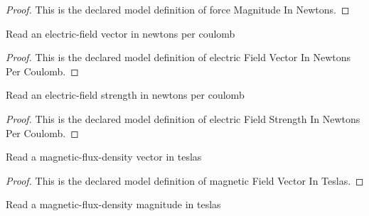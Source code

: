 \begin{proof}
  This is the declared model definition of force Magnitude In Newtons.
\end{proof}
\begin{definition}
  \label{def:physics:phyx-mini-0958:phyxminiproblems-problemphyxmini0958-electricfieldvectorinnewtonspercoulomb}
  Read an electric-field vector in newtons per coulomb
\end{definition}
\begin{proof}
  This is the declared model definition of electric Field Vector In Newtons Per Coulomb.
\end{proof}
\begin{definition}
  \label{def:physics:phyx-mini-0958:phyxminiproblems-problemphyxmini0958-electricfieldstrengthinnewtonspercoulomb}
  Read an electric-field strength in newtons per coulomb
\end{definition}
\begin{proof}
  This is the declared model definition of electric Field Strength In Newtons Per Coulomb.
\end{proof}
\begin{definition}
  \label{def:physics:phyx-mini-0958:phyxminiproblems-problemphyxmini0958-magneticfieldvectorinteslas}
  Read a magnetic-flux-density vector in teslas
\end{definition}
\begin{proof}
  This is the declared model definition of magnetic Field Vector In Teslas.
\end{proof}
\begin{definition}
  \label{def:physics:phyx-mini-0958:phyxminiproblems-problemphyxmini0958-magneticfluxdensityinteslas}
  Read a magnetic-flux-density magnitude in teslas
\end{definition}
